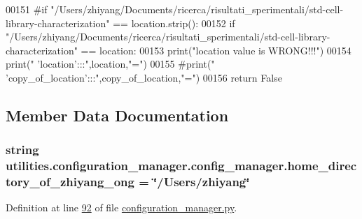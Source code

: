 \begin{DoxyCode}
00151             \textcolor{comment}{#if "/Users/zhiyang/Documents/ricerca/risultati\_sperimentali/std-cell-library-characterization"
       == location.strip():}
00152             \textcolor{keywordflow}{if} \textcolor{stringliteral}{"/Users/zhiyang/Documents/ricerca/risultati\_sperimentali/std-cell-library-characterization"} 
      == location:
00153                 print(\textcolor{stringliteral}{"location value is WRONG!!!"})
00154             print(\textcolor{stringliteral}{" 'location':::"},location,\textcolor{stringliteral}{"="})
00155             \textcolor{comment}{#print("    'copy\_of\_location':::",copy\_of\_location,"=")}
00156             \textcolor{keywordflow}{return} \textcolor{keyword}{False}
\end{DoxyCode}


\subsection{Member Data Documentation}
\hypertarget{classutilities_1_1configuration__manager_1_1config__manager_a884c4ec67676c35cc6fd674c208abfe2}{}
\subsubsection[{home\+\_\+directory\+\_\+of\+\_\+zhiyang\+\_\+ong}]{\setlength{\rightskip}{0pt plus 5cm}string utilities.\+configuration\+\_\+manager.\+config\+\_\+manager.\+home\+\_\+directory\+\_\+of\+\_\+zhiyang\+\_\+ong = \char`\"{}/Users/zhiyang\char`\"{}\hspace{0.3cm}{\ttfamily [static]}}\label{classutilities_1_1configuration__manager_1_1config__manager_a884c4ec67676c35cc6fd674c208abfe2}


Definition at line \hyperlink{configuration__manager_8py_source_l00092}{92} of file \hyperlink{configuration__manager_8py_source}{configuration\+\_\+manager.\+py}.

\hypertarget{classutilities_1_1configuration__manager_1_1config__manager_a19ed9ae453acea0ed85f704f18ee4b30}{}
